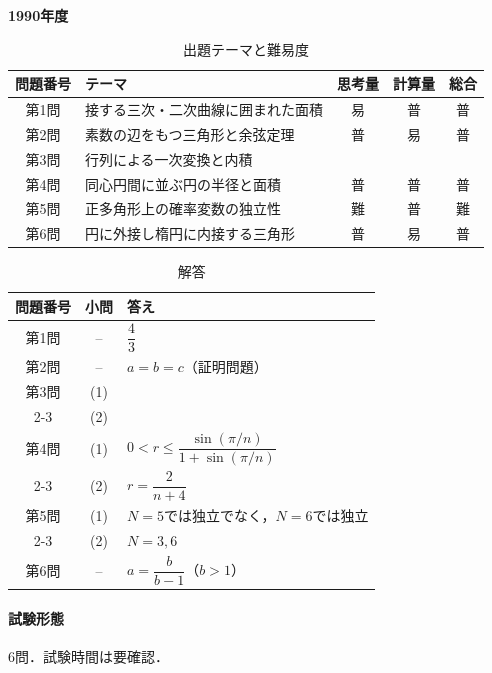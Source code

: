 \documentclass[../../main.tex]{subfiles}
\begin{document}
\begin{center}
  {\fontsize{48pt}{58pt}\selectfont \textbf{1990}\normalsize\textbf{年度}}
\end{center}

\begin{table}[htb]
  \centering
  \caption{出題テーマと難易度}
  \begin{tabular}{|c|p{6.2cm}|c|c|c|}
    \hline
    \textbf{問題番号} & \textbf{テーマ} & \textbf{思考量} & \textbf{計算量} & \textbf{総合} \\
    \hline
    第1問 & 接する三次・二次曲線に囲まれた面積 & 易 & 普 & 普 \\
    \hline
    第2問 & 素数の辺をもつ三角形と余弦定理 & 普 & 易 & 普 \\
    \hline
    第3問 & 行列による一次変換と内積 &  &  &  \\
    \hline
    第4問 & 同心円間に並ぶ円の半径と面積 & 普 & 普 & 普 \\
    \hline
    第5問 & 正多角形上の確率変数の独立性 & 難 & 普 & 難 \\
    \hline
    第6問 & 円に外接し楕円に内接する三角形 & 普 & 易 & 普 \\
    \hline
  \end{tabular}
\end{table}

\begin{table}[htb]
  \centering
  \caption{解答}
  \renewcommand{\arraystretch}{1.4}
  \begin{tabular}{|c|c|p{9cm}|}
    \hline
    \textbf{問題番号} & \textbf{小問} & \textbf{答え} \\
    \hline
    第1問 & -- & $\dfrac{4}{3}$ \\
    \hline
    第2問 & -- & $a=b=c$（証明問題） \\
    \hline
    第3問 & (1) &  \\
    \cline{2-3}
    & (2) &  \\
    \hline
    第4問 & (1) & $0<r\le\dfrac{\sin(\pi/n)}{1+\sin(\pi/n)}$ \\
    \cline{2-3}
    & (2) & $r=\dfrac{2}{n+4}$ \\
    \hline
    第5問 & (1) & $N=5$では独立でなく，$N=6$では独立 \\
    \cline{2-3}
    & (2) & $N=3,6$ \\
    \hline
    第6問 & -- & $a=\dfrac{b}{b-1}$（$b>1$） \\
    \hline
  \end{tabular}
\end{table}

\paragraph{試験形態}
6問．試験時間は要確認．
\end{document}
